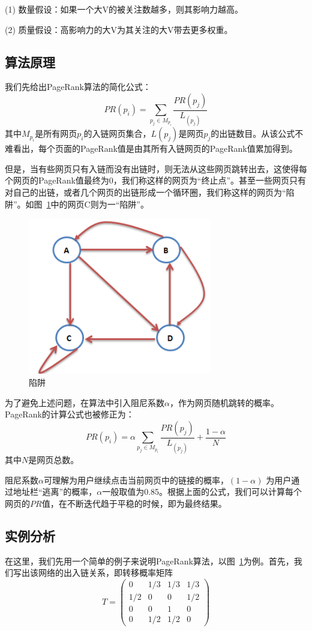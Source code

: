 \documentclass[a4paper]{article}
\begin{document}
\begin{spacing}{1.5}
(1) 数量假设：如果一个大V的被关注数越多，则其影响力越高。

(2) 质量假设：高影响力的大V为其关注的大V带去更多权重。


\subsection{算法原理}

我们先给出PageRank算法的简化公式：
\[PR(p_i)=\sum_{p_j\in M_{p_i}}\frac{PR(p_j)}{L_({p_j})}\]
其中$M_{p_i}$是所有网页$p_i$的入链网页集合，$L(p_j)$是网页$p_j$的出链数目。从该公式不难看出，每个页面的PageRank值是由其所有入链网页的PageRank值累加得到。

但是，当有些网页只有入链而没有出链时，则无法从这些网页跳转出去，这使得每个网页的PageRank值最终为0，我们称这样的网页为``终止点''。甚至一些网页只有对自己的出链，或者几个网页的出链形成一个循环圈，我们称这样的网页为``陷阱''。如图~\ref{xj}中的网页C则为一``陷阱''。

\begin{figure}[htp]
  \centering
  \includegraphics[width=8cm]{fig/Fig1.jpg}
  \caption{陷阱}\label{xj}
\end{figure}

为了避免上述问题，在算法中引入阻尼系数$\alpha$，作为网页随机跳转的概率。PageRank的计算公式也被修正为：
\[PR(p_i)=\alpha\sum_{p_j\in M_{p_i}}\frac{PR(p_j)}{L_({p_j})}+\frac{1-\alpha}{N}\]
其中$N$是网页总数。

阻尼系数$\alpha$可理解为用户继续点击当前网页中的链接的概率，$(1-\alpha)$
为用户通过地址栏``逃离''的概率，$\alpha$一般取值为0.85。根据上面的公式，我们可以计算每个网页的$PR$值，在不断迭代趋于平稳的时候，即为最终结果。

\subsection{实例分析}
在这里，我们先用一个简单的例子来说明PageRank算法，以图~\ref{xj}为例。首先，我们写出该网络的出入链关系，即转移概率矩阵
\[T=\begin{pmatrix}0&1/3&1/3&1/3\\
1/2&0&0&1/2\\
0&0&1&0\\
0&1/2&1/2&0\end{pmatrix}\]


\end{spacing}
\end{document}
